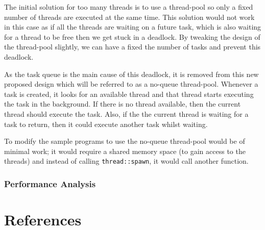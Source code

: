 \documentclass[conference]{IEEEtran}
\begin{document}
The initial solution for too many threads is to use a thread-pool so only a fixed number of threads are executed at the same time. This solution would not work in this case as if all the threads are waiting on a future task, which is also waiting for a thread to be free then we get stuck in a deadlock. By tweaking the design of the thread-pool slightly, we can have a fixed the number of tasks and prevent this deadlock.

As the task queue is the main cause of this deadlock, it is removed from this new proposed design which will be referred to as a no-queue thread-pool. Whenever a task is created, it looks for an available thread and that thread starts executing the task in the background. If there is no thread available, then the current thread should execute the task. Also, if the the current thread is waiting for a task to return, then it could execute another task whilst waiting.  

To modify the sample programs to use the no-queue thread-pool would be of minimal work; it would require a shared memory space (to gain access to the threads) and instead of calling \texttt{thread::spawn}, it would call another function.

\subsubsection{Performance Analysis}

\section{References}
\printbibliography[heading=none]
\end{document}
